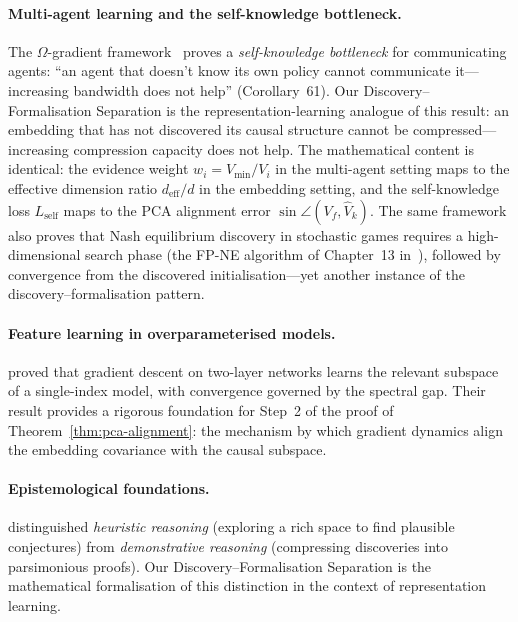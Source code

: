 \documentclass[11pt,a4paper]{article}
\theoremstyle{plain}
\theoremstyle{definition}
\theoremstyle{remark}
\newcommand{\deff}{d_{\mathrm{eff}}}
\begin{document}
\paragraph{Multi-agent learning and the self-knowledge bottleneck.}
The $\Omega$-gradient framework~\citep{omega2026} proves a
\emph{self-knowledge bottleneck} for communicating agents: ``an agent that
doesn't know its own policy cannot communicate it---increasing bandwidth does
not help'' (Corollary~61).  Our Discovery--Formalisation Separation is the
representation-learning analogue of this result: an embedding that has not
discovered its causal structure cannot be compressed---increasing compression
capacity does not help.  The mathematical content is identical: the evidence
weight $w_i = V_{\min}/V_i$ in the multi-agent setting maps to the effective
dimension ratio $\deff/d$ in the embedding setting, and the self-knowledge
loss $L_{\mathrm{self}}$ maps to the PCA alignment error
$\sin\angle(V_f, \hat{V}_k)$.  The same framework also proves that Nash
equilibrium discovery in stochastic games requires a high-dimensional search
phase (the FP-NE algorithm of Chapter~13 in~\citealt{omega2026}), followed by
convergence from the discovered initialisation---yet another instance of the
discovery--formalisation pattern.

\paragraph{Feature learning in overparameterised models.}
\citet{damian2022neural} proved that gradient descent on two-layer networks
learns the relevant subspace of a single-index model, with convergence governed
by the spectral gap.  Their result provides a rigorous foundation for Step~2 of
the proof of Theorem~\ref{thm:pca-alignment}: the mechanism by which gradient
dynamics align the embedding covariance with the causal subspace.

\paragraph{Epistemological foundations.}
\citet{polya1954patterns} distinguished \emph{heuristic reasoning} (exploring a
rich space to find plausible conjectures) from \emph{demonstrative reasoning}
(compressing discoveries into parsimonious proofs).  Our
Discovery--Formalisation Separation is the mathematical formalisation of this
distinction in the context of representation learning.


\end{document}
